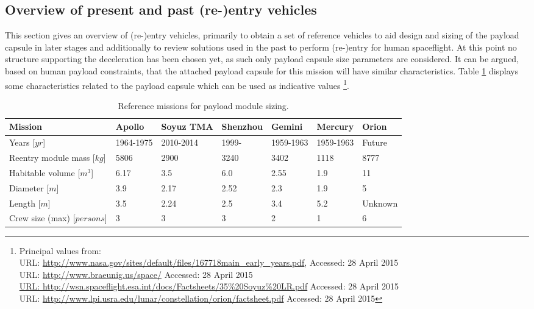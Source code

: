 \subsection{Overview of present and past (re-)entry vehicles}\label{cha:past missions}
This section gives an overview of (re-)entry vehicles, primarily to obtain a set of reference vehicles to aid design and sizing of the payload capsule in later stages and additionally to review solutions used in the past to perform (re-)entry for human spaceflight. At this point no structure supporting the deceleration has been chosen yet, as such only payload capsule size parameters are considered. It can be argued, based on human payload constraints, that the attached payload capsule for this mission will have similar characteristics. Table \ref{tab:refmis} displays some characteristics related to the payload capsule which can be used as indicative values \footnote{Principal values from: \\
URL: \url{http://www.nasa.gov/sites/default/files/167718main\_early\_years.pdf},  Accessed: 28 April 2015 \\ URL: \url{http://www.braeunig.us/space/} Accessed: 28 April 2015 \\ \url{URL: http://wsn.spaceflight.esa.int/docs/Factsheets/35\%20Soyuz\%20LR.pdf} Accessed: 28 April 2015 \\
URL: \url{http://www.lpi.usra.edu/lunar/constellation/orion/factsheet.pdf} Accessed: 28 April 2015}. 

\begin{table}[H]
	\caption[Reference missions for payload module sizing]{Reference missions for payload module sizing.}
		\begin{tabular}{|p{}|p{}|p{}|p{}|p{}|p{}|p{}|} %
			\hline
			Mission 						& Apollo & 	Soyuz TMA &	Shenzhou & Gemini & Mercury & Orion \\ \hline \hline
			Years [$yr$]					&	1964-1975	& 	2010-2014&	1999- &   1959-1963  & 1959-1963 & Future \\ \hline
			Reentry module mass [$kg$]  	&	5806& 	2900 &	3240 & 3402 & 1118 & 8777 \\ \hline
			Habitable volume [$m^3$]		&	6.17& 	3.5  &	6.0  & 2.55 & 1.9 & 11   \\ \hline
			Diameter [$m$]			 		&	3.9 & 	2.17  &	2.52 & 2.3 & 1.9 & 5   \\ \hline
			Length  [$m$]			 		&	3.5 & 	2.24  &	2.5  & 3.4 &  5.2 & Unknown  \\ \hline
			Crew size (max) [$persons$]		&	3   & 	3     &	3    & 2   &  1   & 6   \\ \hline
		\end{tabular}
    \label{tab:refmis}
\end{table}

